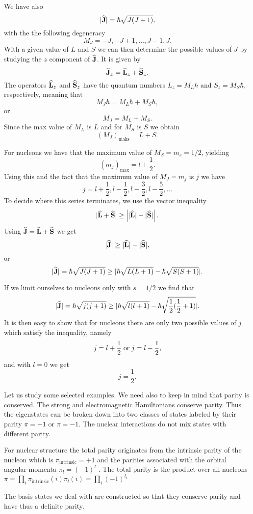 \begin{enumerate}
We have also
\[
   |{\bf\widehat{J}}|=\hbar\sqrt{J(J+1)},
\]
with the the following degeneracy
\[
   M_J=-J, -J+1, \dots, J-1, J.
\]
With a given value of  $L$ and $S$ we can then determine the possible values of 
 $J$ by studying the $z$ component of  ${\bf\widehat{J}}$. 
It is given by
\[
{\bf\widehat{J}}_z={\bf\widehat{L}}_z+{\bf\widehat{S}}_z.
\]
The operators ${\bf\widehat{L}}_z$ and ${\bf\widehat{S}}_z$ have the quantum numbers
$L_z=M_L\hbar$ and $S_z=M_S\hbar$, respectively, meaning that
\[
   M_J\hbar=M_L\hbar +M_S\hbar,
\]
or
\[
   M_J=M_L +M_S.
\]
Since the max value of  $M_L$ is $L$ and for  $M_S$ is $S$
we obtain
\[
   (M_J)_{\mathrm{maks}}=L+S.
\]

For nucleons we have that the maximum value of $M_S=m_s=1/2$, yielding
\[
   (m_j)_{\mathrm{max}}=l+\frac{1}{2}.
\]
Using this and the fact that the maximum value of  $M_J=m_j$ is $j$ we have
\[
   j=l+\frac{1}{2}, l-\frac{1}{2}, l-\frac{3}{2}, l-\frac{5}{2}, \dots 
\]
To decide where this series terminates, we use the vector inequality
\[
   |{\bf\widehat{L}}+{\bf\widehat{S}}| \ge \left| |{\bf\widehat{L}}|-|{\bf\widehat{S}}|\right|.
\]
Using ${\bf\widehat{J}}={\bf\widehat{L}}+{\bf\widehat{S}}$ we get 
\[
   |{\bf\widehat{J}}| \ge |{\bf\widehat{L}}|-|{\bf\widehat{S}}|,
\]
or
\[
   |{\bf\widehat{J}}|=\hbar\sqrt{J(J+1)}\ge |\hbar\sqrt{L(L+1)}-
   \hbar\sqrt{S(S+1)}|.
\]

If we limit ourselves to nucleons only with $s=1/2$
we find that
\[
   |{\bf\widehat{J}}|=\hbar\sqrt{j(j+1)}\ge |\hbar\sqrt{l(l+1)}-
   \hbar\sqrt{\frac{1}{2}(\frac{1}{2}+1)}|.
\]
It is then easy to show that for nucleons there are only two possible values of
$j$ which satisfy the inequality, namely
\[
   j=l+\frac{1}{2}\hspace{0.1cm} \mathrm{or} \hspace{0.1cm}j=l-\frac{1}{2},
\]
and with $l=0$ we get 
\[
   j=\frac{1}{2}.
\]

Let us study some selected examples. We need also to keep in mind that parity is conserved.
The strong and electromagnetic Hamiltonians conserve parity. Thus the eigenstates can be
broken down into two classes of states labeled by their parity $\pi= +1$ or $\pi=-1$.
The nuclear interactions do not mix states with different parity.

For nuclear structure the total parity originates
from the intrinsic parity of the nucleon which is $\pi_{\mathrm{intrinsic}}=+1$ 
and the parities associated with
the orbital angular momenta $\pi_l=(-1)^l$ . The total parity is the product over all nucleons
$\pi = \prod_i \pi_{\mathrm{intrinsic}}(i)\pi_l(i) = \prod_i (-1)^{l_i}$

The basis states we deal with are constructed so that they conserve parity and have thus a definite parity. 


\end{enumerate}
